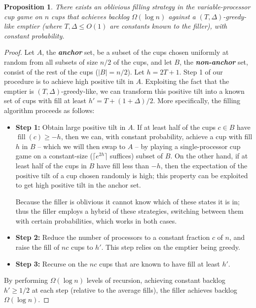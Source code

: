 \documentclass[twocolumn]{article}[10pt]
\newcommand{\defn}[1]{{\textit{\textbf{\boldmath #1}}}\xspace}
\DeclareMathOperator{\fil}{\text{fill}}
\newtheorem{proposition}{Proposition}
\begin{document}
\begin{proposition}
  \label{prop:obliviousBase}
  There exists an oblivious filling strategy in the variable-processor cup game
  on $n$ cups that achieves backlog $\Omega(\log n)$ against a $(T,
  \Delta)$-greedy-like emptier (where $T, \Delta \le O(1)$ are constants
  known to the filler), with constant probability.
\end{proposition}
\begin{proof}
  {\color{red}
  Let $A$, the \defn{anchor} set, be a subset of the cups chosen uniformly at
  random from all subsets of size $n/2$ of the cups, and let $B$, the
  \defn{non-anchor} set, consist of the rest of the cups ($|B| = n/2$). Let $h
  = 2 T + 1$. Step 1 of our procedure is to achieve high positive tilt in $A$.
  Exploiting the fact that the emptier is $(T, \Delta)$-greedy-like, we can
  transform this positive tilt into a known set of cups with fill at least $h'
  = T + (1+\Delta)/2$. More specifically, the filling algorithm proceeds as follows: 
  \begin{itemize}
    \item \textbf{Step 1:} 
      Obtain large positive tilt in $A$. If at least half of the cups $c\in B$
      have $\fil(c) \ge -h$, then we can, with constant probability, achieve
      a cup with fill $h$ in $B$ -- which we will then swap to $A$ -- by
      playing a single-processor cup game on a constant-size ($\lceil e^{2h}
      \rceil$ suffices) subset of $B$. 
      On the other hand, if at least half of the cups in $B$ have fill less than
      $-h$, then the expectation of the positive tilt of a cup chosen
      randomly is high; this property can be exploited to get high positive
      tilt in the anchor set.

      Because the filler is oblivious it cannot know which of these states it is in; 
      thus the filler employs a hybrid of these strategies, switching between
      them with certain probabilities, which works in both cases.
  \item \textbf{Step 2:} Reduce the number of processors to a constant fraction
    $c$ of $n$, and raise the fill of $nc$ cups to $h'$. This step relies on
    the emptier being greedy.
  \item \textbf{Step 3:} Recurse on the $nc$ cups that are known to have fill
    at least $h'$.
\end{itemize}
By performing $\Omega(\log n)$ levels of recursion, achieving constant backlog
$h'\ge 1/2$ at each step (relative to the average fills), the filler achieves backlog
$\Omega(\log n)$.

}
\end{proof}
\end{document}
